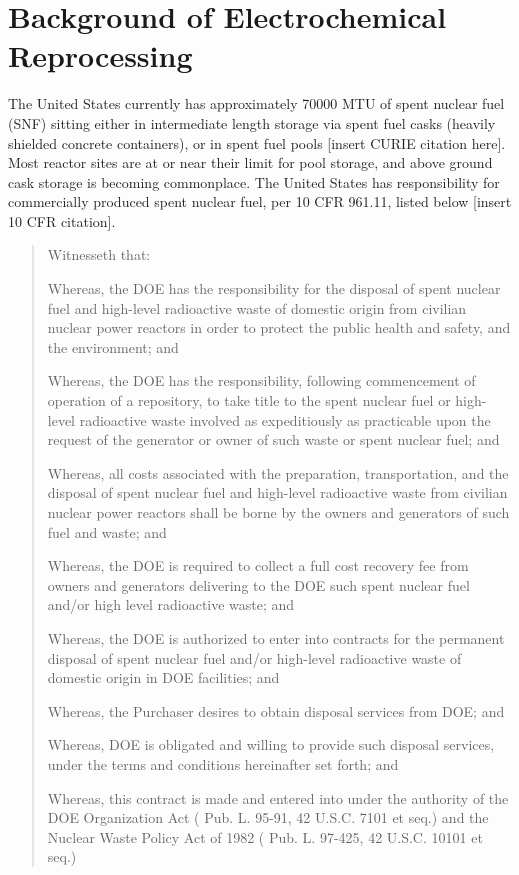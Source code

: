 \chapter{Background of Electrochemical Reprocessing} \label{ch:background}

The United States currently has approximately 70000 MTU of spent nuclear fuel (SNF) sitting either in intermediate length storage via spent fuel casks (heavily shielded concrete containers), or in spent fuel pools [insert CURIE citation here]. Most reactor sites are at or near their limit for pool storage, and above ground cask storage is becoming commonplace. The United States has responsibility for commercially produced spent nuclear fuel, per 10 CFR 961.11, listed below [insert 10 CFR citation]. 

\begin{quote}
Witnesseth that:

Whereas, the DOE has the responsibility for the disposal of spent nuclear fuel and high-level radioactive waste of domestic origin from civilian nuclear power reactors in order to protect the public health and safety, and the environment; and

Whereas, the DOE has the responsibility, following commencement of operation of a repository, to take title to the spent nuclear fuel or high-level radioactive waste involved as expeditiously as practicable upon the request of the generator or owner of such waste or spent nuclear fuel; and

Whereas, all costs associated with the preparation, transportation, and the disposal of spent nuclear fuel and high-level radioactive waste from civilian nuclear power reactors shall be borne by the owners and generators of such fuel and waste; and

Whereas, the DOE is required to collect a full cost recovery fee from owners and generators delivering to the DOE such spent nuclear fuel and/or high level radioactive waste; and

Whereas, the DOE is authorized to enter into contracts for the permanent disposal of spent nuclear fuel and/or high-level radioactive waste of domestic origin in DOE facilities; and

Whereas, the Purchaser desires to obtain disposal services from DOE; and

Whereas, DOE is obligated and willing to provide such disposal services, under the terms and conditions hereinafter set forth; and

Whereas, this contract is made and entered into under the authority of the DOE Organization Act ( Pub. L. 95-91, 42 U.S.C. 7101 et seq.) and the Nuclear Waste Policy Act of 1982 ( Pub. L. 97-425, 42 U.S.C. 10101 et seq.)
\end{quote}

